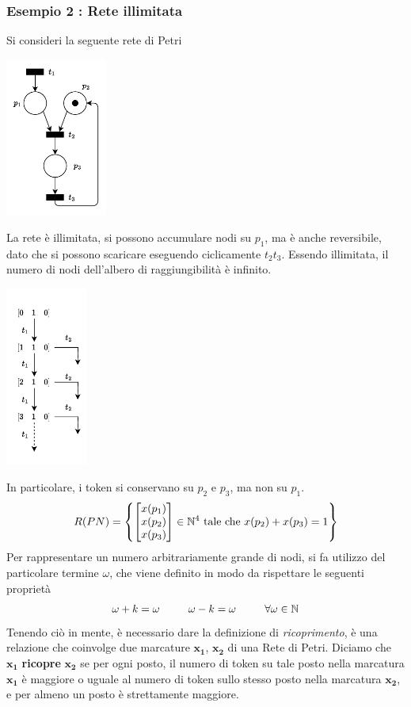 \documentclass[10pt, letterpaper]{report}
\begin{document}
\subsubsection{Esempio 2 : Rete illimitata}
Si consideri la seguente rete di Petri
\begin{center}
    \includegraphics[width=0.25\textwidth]{images/AlberoIll.drawio.pdf}
\end{center}
La rete è illimitata, si possono accumulare nodi su $p_1$,  ma è anche reversibile, dato che si possono scaricare eseguendo ciclicamente $t_2t_3$. Essendo illimitata, il numero di nodi dell'albero di raggiungibilità è infinito.
\begin{center}
    \includegraphics[width=0.2\textwidth]{images/alberoIll2.drawio.pdf}
\end{center}
In particolare, i token si conservano su $p_2$ e $p_3$, ma non su $p_1$. 
$$ R(PN)= \left\{   \begin{bmatrix}x(p_1)\\x(p_2)\\x(p_3) \end{bmatrix} \in {\mathbb N}^4 \text{ tale che }x(p_2)+x(p_3)=1  \right\}$$
Per rappresentare un numero arbitrariamente grande di nodi, si fa utilizzo del particolare termine $\omega$, che viene definito in modo da rispettare le seguenti proprietà 
$$ \omega+k=\omega \ \ \ \ \ \ \ \ \omega-k=\omega \ \ \ \ \ \ \ \ \forall \omega \in \N$$
Tenendo ciò in mente, è necessario dare la definizione di \textit{ricoprimento}, è una relazione che coinvolge due marcature $\mathbf{x_1}$, $\mathbf{x_2}$ di una Rete di Petri. Diciamo che $\mathbf{x_1}$ \textbf{ricopre} $\mathbf{x_2}$ se per ogni posto, il numero di token su tale posto nella marcatura $\mathbf{x_1}$ è maggiore o uguale al numero di token sullo stesso posto nella marcatura $\mathbf{x_2}$, e per almeno un posto è strettamente maggiore. 
\end{document}
